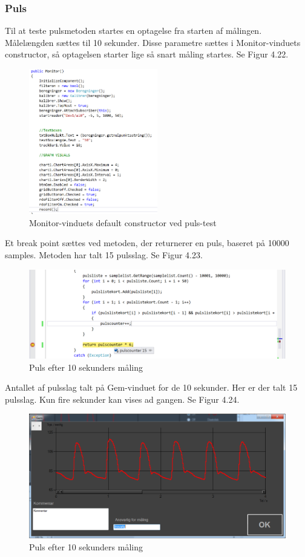 \subsubsection{Puls}
Til at teste pulsmetoden startes en optagelse fra starten af målingen. Målelængden sættes til 10 sekunder. Disse parametre sættes i Monitor-vinduets constructor, så optagelsen starter lige så snart måling startes. Se Figur 4.22.
\begin{figure}[H]
	\centering
	\includegraphics[width=0.5\textwidth]{Figurer/Pulstest_record}
	\caption{Monitor-vinduets default constructor ved puls-test}
\end{figure}
Et break point sættes ved metoden, der returnerer en puls, baseret på 10000 samples. Metoden har talt 15 pulsslag. Se Figur 4.23.
\begin{figure}[H]
	\centering
	\includegraphics[width=1\textwidth]{Figurer/Pulstest_debug}
	\caption{Puls efter 10 sekunders måling}
\end{figure}
Antallet af pulsslag talt på Gem-vinduet for de 10 sekunder. Her er der talt 15 pulsslag. Kun fire sekunder kan vises ad gangen. Se Figur 4.24.
\begin{figure}[H]
	\centering
	\includegraphics[width=1\textwidth]{Figurer/Pulstest_gemmevindue}
	\caption{Puls efter 10 sekunders måling}
\end{figure}

